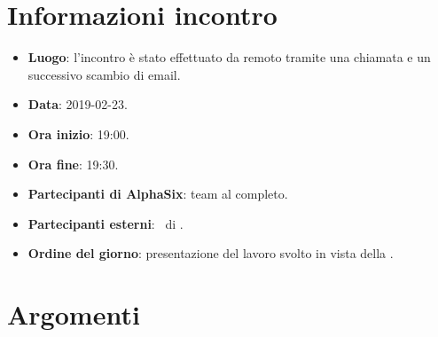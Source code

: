 \newcommand{\documento}{\VE}
\newcommand{\nomedocumentofisico}{VE\_2019-02-23.pdf}
\newcommand{\redazione}{\TG}
\newcommand{\verifica}{\CV}
\newcommand{\approvazione}{\SG}
\newcommand{\versione}{1.0.0}
\newcommand{\uso}{Esterno}
\newcommand{\destinateTo}{\TV, \\ & \RC, \\ & \II}
\newcommand{\datacreazione}{23 febbraio 2019}
\newcommand{\datamodifica}{25 febbraio 2019}
\newcommand{\stato}{Approvato}

\def\TABELLE{false}	%
\def\FIGURE{false} 	%






    

    
    
    \section{Informazioni incontro}
    	\begin{itemize}
    		\item \textbf{Luogo}: l'incontro è stato effettuato da remoto tramite una chiamata  e un successivo scambio di email.
    		\item \textbf{Data}: 2019-02-23.
    		\item \textbf{Ora inizio}: 19:00.
    		\item \textbf{Ora fine}: 19:30.
    		\item \textbf{Partecipanti di AlphaSix}: team al completo.
    		\item \textbf{Partecipanti esterni}: \DZ~di \II.
    		\item \textbf{Ordine del giorno}: presentazione del lavoro svolto in vista della .
    		
    	\end{itemize}
    
    \section{Argomenti}
    
